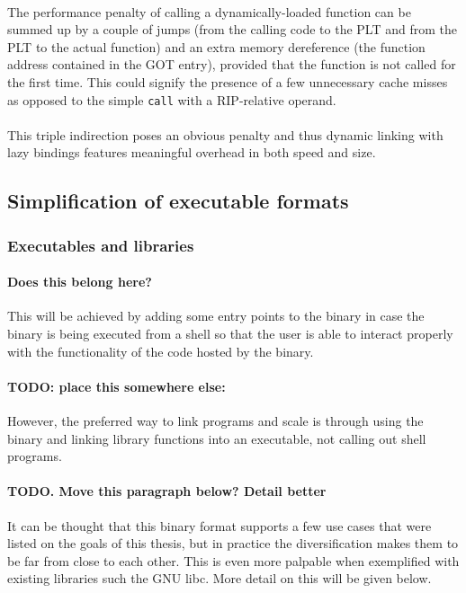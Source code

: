 \documentclass[12pt]{article}
\begin{document}
	\paragraph{}The performance penalty of calling a dynamically-loaded function can be summed up by a couple of jumps (from the calling code to the PLT and from the PLT to the actual function) and an extra memory dereference (the function address contained in the GOT entry), provided that the function is not called for the first time. This could signify the presence of a few unnecessary cache misses as opposed to the simple \verb|call| with a RIP-relative operand.
	\paragraph{}This triple indirection poses an obvious penalty and thus dynamic linking with lazy bindings features meaningful overhead in both speed and size.
	
	\subsection{Simplification of executable formats}
	\subsubsection{Executables and libraries}
	
	\paragraph{Does this belong here?} This will be achieved by adding some entry points to the binary in case the binary is being executed from a shell so that the user is able to interact properly with the functionality of the code hosted by the binary.
	
	\paragraph{TODO: place this somewhere else:}However, the preferred way to link programs and scale is through using the binary and linking library functions into an executable, not calling out shell programs.
	
	\paragraph{TODO. Move this paragraph below? Detail better}It can be thought that this binary format supports a few use cases that were listed on the goals of this thesis, but in practice the diversification makes them to be far from close to each other. This is even more palpable when exemplified with existing libraries such the GNU libc. More detail on this will be given below.
	
\end{document}
